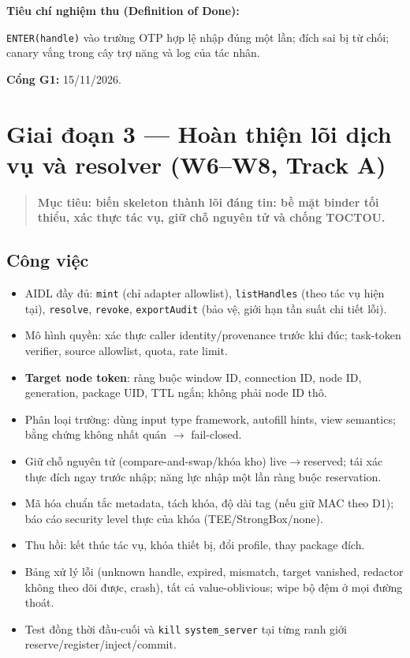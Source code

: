 \documentclass[11pt,a4paper]{article}
\newcommand{\code}[1]{\texttt{\small #1}}
\newcommand{\term}[1]{\textbf{#1}}
\newenvironment{phasebox}
  {\begin{quote}\color{shblue}\bfseries}
  {\end{quote}}
\newcommand{\dod}[1]{\par\vspace{0.3em}\noindent\textbf{\color{shgreen}Tiêu chí nghiệm thu (Definition of Done):}\par\vspace{0.2em}\noindent #1}
\newcommand{\gate}[2]{\par\vspace{0.3em}\noindent\textbf{\color{shred}Cổng #1:} #2}
\begin{document}
\dod{\code{ENTER(handle)} vào trường OTP hợp lệ nhập đúng một lần; đích sai bị từ chối; canary vắng trong cây trợ năng và log của tác nhân.}

\gate{G1}{15/11/2026.}

\section{Giai đoạn 3 --- Hoàn thiện lõi dịch vụ và resolver (W6--W8, Track A)}

\begin{phasebox}Mục tiêu: biến skeleton thành lõi đáng tin: bề mặt binder tối thiểu, xác thực tác vụ, giữ chỗ nguyên tử và chống TOCTOU.\end{phasebox}

\subsection{Công việc}

\begin{itemize}
  \item AIDL đầy đủ: \code{mint} (chỉ adapter allowlist), \code{listHandles} (theo tác vụ hiện tại), \code{resolve}, \code{revoke}, \code{exportAudit} (bảo vệ, giới hạn tần suất chi tiết lỗi).
  \item Mô hình quyền: xác thực caller identity/provenance trước khi đúc; task-token verifier, source allowlist, quota, rate limit.
  \item \term{Target node token}: ràng buộc window ID, connection ID, node ID, generation, package UID, TTL ngắn; không phải node ID thô.
  \item Phân loại trường: dùng input type framework, autofill hints, view semantics; bằng chứng không nhất quán $\to$ fail-closed.
  \item Giữ chỗ nguyên tử (compare-and-swap/khóa kho) live$\to$reserved; tái xác thực đích ngay trước nhập; năng lực nhập một lần ràng buộc reservation.
  \item Mã hóa chuẩn tắc metadata, tách khóa, độ dài tag (nếu giữ MAC theo D1); báo cáo security level thực của khóa (TEE/StrongBox/none).
  \item Thu hồi: kết thúc tác vụ, khóa thiết bị, đổi profile, thay package đích.
  \item Bảng xử lý lỗi (unknown handle, expired, mismatch, target vanished, redactor không theo dõi được, crash), tất cả value-oblivious; wipe bộ đệm ở mọi đường thoát.
  \item Test đồng thời đầu-cuối và \code{kill} \code{system\_server} tại từng ranh giới reserve/register/inject/commit.
\end{itemize}
\end{document}
